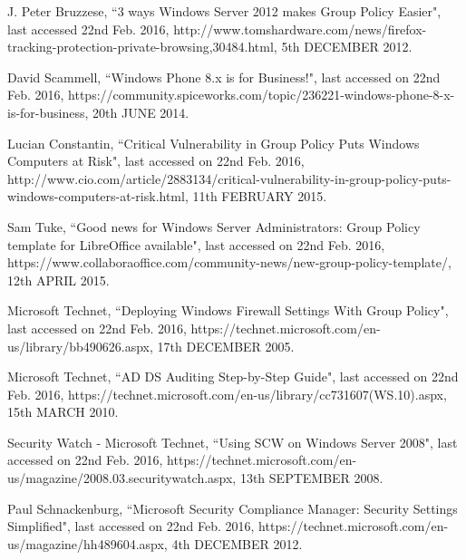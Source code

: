 \documentclass[12pt]{extarticle}
\begin{document}
\begin{thebibliography}{99}


J. Peter Bruzzese, ``3 ways Windows Server 2012 makes Group Policy Easier", last accessed 22nd Feb. 2016, http://www.tomshardware.com/news/firefox-tracking-protection-private-browsing,30484.html, 5th DECEMBER 2012.


David Scammell, ``Windows Phone 8.x is for Business!", last accessed on 22nd Feb. 2016, https://community.spiceworks.com/topic/236221-windows-phone-8-x-is-for-business, 20th JUNE 2014.


Lucian Constantin, ``Critical Vulnerability in Group Policy Puts Windows Computers at Risk", last accessed on 22nd Feb. 2016, http://www.cio.com/article/2883134/critical-vulnerability-in-group-policy-puts-windows-computers-at-risk.html, 11th FEBRUARY 2015.
    

Sam Tuke, ``Good news for Windows Server Administrators: Group Policy template for LibreOffice available", last accessed on 22nd Feb. 2016, https://www.collaboraoffice.com/community-news/new-group-policy-template/, 12th APRIL 2015.
    

Microsoft Technet, ``Deploying Windows Firewall Settings With Group Policy", last accessed on 22nd Feb. 2016, https://technet.microsoft.com/en-us/library/bb490626.aspx, 17th DECEMBER 2005.


Microsoft Technet, ``AD DS Auditing Step-by-Step Guide", last accessed on 22nd Feb. 2016, https://technet.microsoft.com/en-us/library/cc731607(WS.10).aspx, 15th MARCH 2010.


Security Watch - Microsoft Technet, ``Using SCW on Windows Server 2008", last accessed on 22nd Feb. 2016, https://technet.microsoft.com/en-us/magazine/2008.03.securitywatch.aspx, 13th SEPTEMBER 2008.


Paul Schnackenburg, ``Microsoft Security Compliance Manager: Security Settings Simplified", last accessed on 22nd Feb. 2016, https://technet.microsoft.com/en-us/magazine/hh489604.aspx, 4th DECEMBER 2012.



\end{thebibliography}
\end{document}
